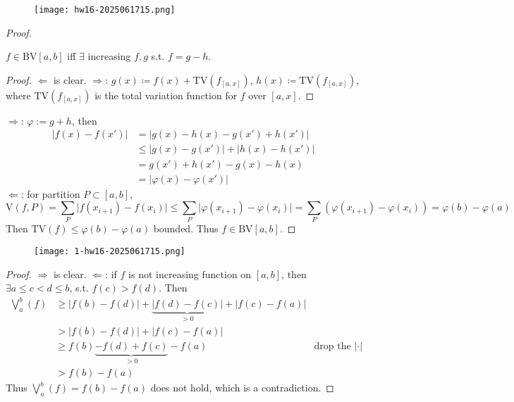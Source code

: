 \begin{exercise}
\begin{figure}[H]
\centering
\texttt{[image: hw16-2025061715.png]}
\label{}
\end{figure}
\end{exercise}
\begin{proof}

\begin{theorem}
$f\in \text{BV}[a,b]$ iff $\exists$ increasing $f,g$ s.t. $f=g-h$.
\end{theorem}
\begin{proof}
$\Leftarrow$ is clear. $\Rightarrow$: $g(x)\coloneqq f(x)+\text{TV}(f_{[a,x]})$, $h(x)\coloneqq\text{TV}(f_{[a,x]})$, where $\text{TV}(f_{[a,x]})$ is the total variation function for $f$ over $[a,x]$.
\end{proof}

$\Rightarrow$: $\varphi:=g+h$, then
\[
\begin{aligned}
\lvert f(x)-f(x') \rvert & =\lvert g(x)-h(x)-g(x')+h(x') \rvert \\
 & \leq \lvert g(x)-g(x') \rvert+\lvert  h(x)-h(x')\rvert \\
 & =g(x')+h(x')-g(x)-h(x) \\
 & =\lvert \varphi(x)-\varphi(x') \rvert 
 \end{aligned}
\]
$\Leftarrow$: for partition $P\subset[a,b]$,
\[
\text{V}(f,P)=\sum_{P}\lvert f(x_{i+1})-f(x_i) \rvert \leq \sum_{P}\lvert \varphi(x_{i+1})-\varphi(x_i) \rvert =\sum_{P}(\varphi(x_{i+1})-\varphi(x_i))=\varphi(b)-\varphi(a)
\]
Then $\text{TV}(f)\leq\varphi(b)-\varphi(a)$ bounded. Thus $f\in\text{BV}[a,b]$.

\end{proof}

\begin{exercise}
\begin{figure}[H]
\centering
\texttt{[image: 1-hw16-2025061715.png]}
\label{}
\end{figure}
\end{exercise}
\begin{proof}
$\Rightarrow$ is clear. $\Leftarrow$: if $f$ is not increasing function on $[a,b]$, then $\exists a\leq c<d\leq b$, s.t. $f(c)>f(d)$. Then
\[
\begin{aligned}
\bigvee_a^b(f) & \geq \lvert f(b)-f(d) \rvert +\underbrace{ \lvert f(d)-f(c) \rvert }_{ >0 } +\lvert f(c)-f(a) \rvert  \\
 & >\lvert f(b)-f(d)  \rvert +\lvert f(c)-f(a) \rvert \\
 & \geq f(b)\underbrace{ -f(d)+f(c) }_{ >0 }-f(a)  &  \text{drop the }\lvert \cdot \rvert\\
 & > f(b)-f(a)
\end{aligned}
\]
Thus $\bigvee_a^b(f)=f(b)-f(a)$ does not hold, which is a contradiction.
\end{proof}

